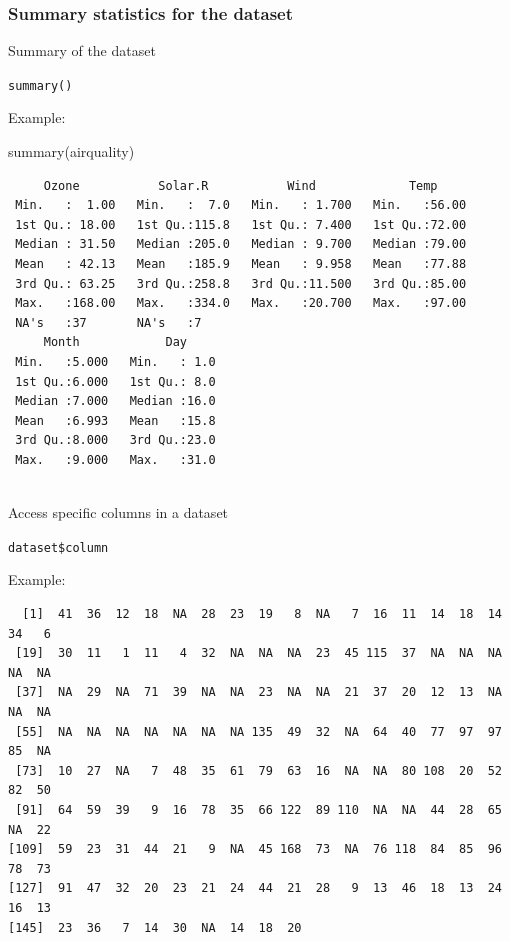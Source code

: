 \documentclass[
  letterpaper,
  DIV=11,
  numbers=noendperiod]{scrreprt}
\newenvironment{Shaded}{\begin{snugshade}}{\end{snugshade}}
\newcommand{\FunctionTok}[1]{\textcolor[rgb]{0.28,0.35,0.67}{#1}}
\newcommand{\NormalTok}[1]{\textcolor[rgb]{0.00,0.23,0.31}{#1}}
\newcommand{\SpecialCharTok}[1]{\textcolor[rgb]{0.37,0.37,0.37}{#1}}
\begin{document}
\subsubsection{Summary statistics for the
dataset}\label{summary-statistics-for-the-dataset}

Summary of the dataset

\texttt{summary()}

Example:

\begin{Shaded}
\begin{Highlighting}[]
\FunctionTok{summary}\NormalTok{(airquality)}
\end{Highlighting}
\end{Shaded}

\begin{verbatim}
     Ozone           Solar.R           Wind             Temp      
 Min.   :  1.00   Min.   :  7.0   Min.   : 1.700   Min.   :56.00  
 1st Qu.: 18.00   1st Qu.:115.8   1st Qu.: 7.400   1st Qu.:72.00  
 Median : 31.50   Median :205.0   Median : 9.700   Median :79.00  
 Mean   : 42.13   Mean   :185.9   Mean   : 9.958   Mean   :77.88  
 3rd Qu.: 63.25   3rd Qu.:258.8   3rd Qu.:11.500   3rd Qu.:85.00  
 Max.   :168.00   Max.   :334.0   Max.   :20.700   Max.   :97.00  
 NA's   :37       NA's   :7                                       
     Month            Day      
 Min.   :5.000   Min.   : 1.0  
 1st Qu.:6.000   1st Qu.: 8.0  
 Median :7.000   Median :16.0  
 Mean   :6.993   Mean   :15.8  
 3rd Qu.:8.000   3rd Qu.:23.0  
 Max.   :9.000   Max.   :31.0  
                               
\end{verbatim}

Access specific columns in a dataset

\texttt{dataset\$column}

Example:

\begin{Shaded}
\end{Shaded}

\begin{verbatim}
  [1]  41  36  12  18  NA  28  23  19   8  NA   7  16  11  14  18  14  34   6
 [19]  30  11   1  11   4  32  NA  NA  NA  23  45 115  37  NA  NA  NA  NA  NA
 [37]  NA  29  NA  71  39  NA  NA  23  NA  NA  21  37  20  12  13  NA  NA  NA
 [55]  NA  NA  NA  NA  NA  NA  NA 135  49  32  NA  64  40  77  97  97  85  NA
 [73]  10  27  NA   7  48  35  61  79  63  16  NA  NA  80 108  20  52  82  50
 [91]  64  59  39   9  16  78  35  66 122  89 110  NA  NA  44  28  65  NA  22
[109]  59  23  31  44  21   9  NA  45 168  73  NA  76 118  84  85  96  78  73
[127]  91  47  32  20  23  21  24  44  21  28   9  13  46  18  13  24  16  13
[145]  23  36   7  14  30  NA  14  18  20
\end{verbatim}
\end{document}
